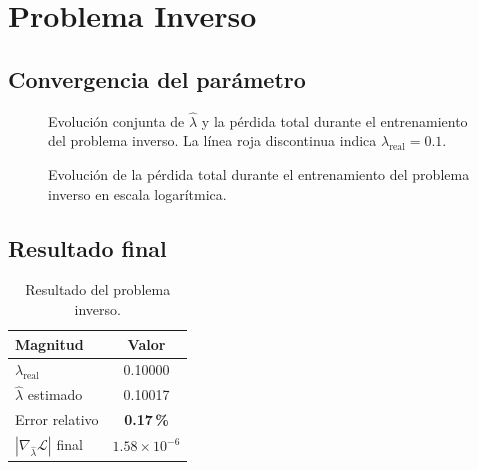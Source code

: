 \documentclass[12pt,a4paper]{article}
\newcommand{\lhat}{\hat{\lambda}}
\newcommand{\ltrue}{\lambda_{\text{real}}}
\begin{document}
\section{Problema Inverso}

\subsection{Convergencia del parámetro}

\begin{figure}[H]
  \centering
  \caption{Evolución conjunta de $\lhat$ y la pérdida total durante el entrenamiento del
           problema inverso. La línea roja discontinua indica $\ltrue=0.1$.}
  \label{fig:conv_lambda}
\end{figure}

\begin{figure}[H]
  \centering
  \caption{Evolución de la pérdida total durante el entrenamiento del problema inverso
           en escala logarítmica.}
  \label{fig:loss_inv}
\end{figure}

\subsection{Resultado final}

\begin{table}[H]
  \centering
  \caption{Resultado del problema inverso.}\label{tab:resultado}
  \begin{tabular}{lc}\toprule
    Magnitud & Valor\\\midrule
    $\ltrue$ & 0.10000\\
    $\lhat$ estimado & 0.10017\\
    Error relativo & \textbf{0.17\,\%}\\
    $|\nabla_{\lhat}\mathcal{L}|$ final & $1.58\times10^{-6}$\\\bottomrule
  \end{tabular}
\end{table}
\end{document}
